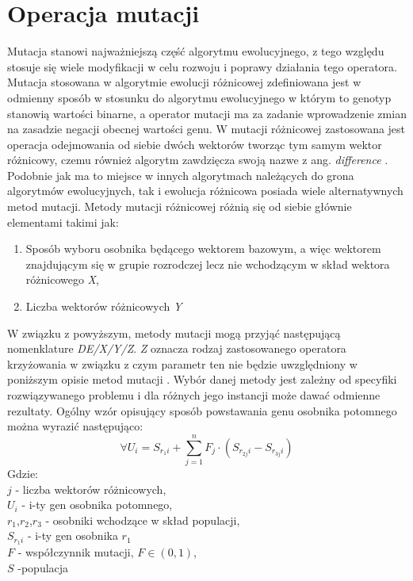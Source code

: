 \chapter{Operacja mutacji}\label{cha:pierwszyDokument}

Mutacja stanowi najważniejszą część algorytmu ewolucyjnego, z tego względu stosuje się wiele modyfikacji w celu rozwoju i poprawy działania tego operatora.
Mutacja stosowana w algorytmie ewolucji różnicowej zdefiniowana jest w odmienny sposób w stosunku do algorytmu ewolucyjnego w którym to genotyp stanowią wartości binarne, a operator mutacji ma za zadanie wprowadzenie zmian na zasadzie negacji obecnej wartości genu. W mutacji różnicowej zastosowana jest operacja odejmowania od siebie dwóch wektorów tworząc tym samym wektor różnicowy, czemu również algorytm zawdzięcza swoją nazwe z ang. \textsl{difference} \cite{przystojny_koles}. Podobnie jak ma to miejsce w innych algorytmach należących do grona algorytmów ewolucyjnych, tak i ewolucja różnicowa posiada wiele alternatywnych metod mutacji. Metody mutacji różnicowej różnią się od siebie głównie elementami takimi jak:

\begin{enumerate}
\item Sposób  wyboru osobnika będącego wektorem bazowym, a więc wektorem znajdującym się w grupie rozrodczej lecz nie wchodzącym w skład wektora różnicowego \textsl{X},
\item Liczba wektorów różnicowych \textsl{Y}
\end{enumerate}
\par
W związku z powyższym, metody mutacji mogą przyjąć następującą nomenklature \textsl{DE/X/Y/Z}. \textsl{Z} oznacza rodzaj zastosowanego operatora krzyżowania w związku z czym parametr ten nie będzie uwzględniony w poniższym opisie metod mutacji . Wybór danej metody jest zależny od specyfiki rozwiązywanego problemu i dla różnych jego instancji może dawać odmienne rezultaty. Ogólny wzór opisujący sposób powstawania genu osobnika potomnego można wyrazić następująco:
$$
 \forall U_{i} =S_{r_{1}i} + \sum_{j=1}^{n} F_{j} \cdot (S_{r_{2j}i} - S_{r_{3j}i})
$$
Gdzie:\\
$j$ - liczba wektorów różnicowych,\\
$U_{i}$ - i-ty gen osobnika potomnego,\\
$r_{1}$,$ r_{2}$,$ r_{3}$ - osobniki wchodzące w skład populacji,\\
$S_{r_{1}i}$ - i-ty gen osobnika $r_{1}$\\
$F$ - współczynnik mutacji, $F \in (0,1)$,\\
$S$ -populacja\\


